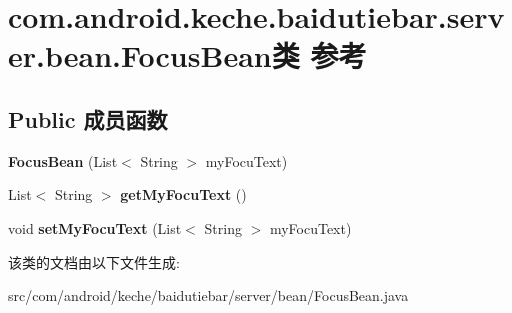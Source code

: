 \hypertarget{classcom_1_1android_1_1keche_1_1baidutiebar_1_1server_1_1bean_1_1_focus_bean}{}\section{com.\+android.\+keche.\+baidutiebar.\+server.\+bean.\+Focus\+Bean类 参考}
\label{classcom_1_1android_1_1keche_1_1baidutiebar_1_1server_1_1bean_1_1_focus_bean}
\subsection*{Public 成员函数}
\begin{DoxyCompactItemize}
\item 
\mbox{\label{classcom_1_1android_1_1keche_1_1baidutiebar_1_1server_1_1bean_1_1_focus_bean_ab21d6e4febfdca9e080e4e8edbbf27db}} 
{\bfseries Focus\+Bean} (List$<$ String $>$ my\+Focu\+Text)
\item 
\mbox{\label{classcom_1_1android_1_1keche_1_1baidutiebar_1_1server_1_1bean_1_1_focus_bean_adba1657ef08ed47f87eff0ee0880ad0f}} 
List$<$ String $>$ {\bfseries get\+My\+Focu\+Text} ()
\item 
\mbox{\label{classcom_1_1android_1_1keche_1_1baidutiebar_1_1server_1_1bean_1_1_focus_bean_a42ad9414f914ca93c28a020637c0f6b3}} 
void {\bfseries set\+My\+Focu\+Text} (List$<$ String $>$ my\+Focu\+Text)
\end{DoxyCompactItemize}


该类的文档由以下文件生成\+:\begin{DoxyCompactItemize}
\item 
src/com/android/keche/baidutiebar/server/bean/Focus\+Bean.\+java\end{DoxyCompactItemize}

